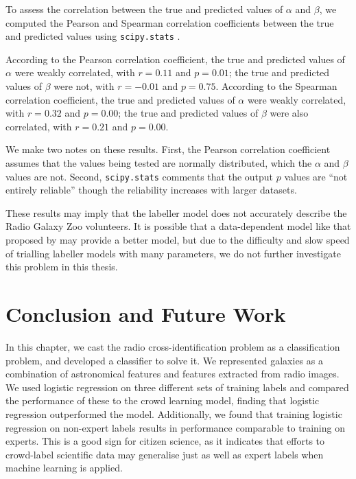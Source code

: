     To assess the correlation between the true and predicted values of $\alpha$
    and $\beta$, we computed the Pearson and Spearman correlation coefficients
    between the true and predicted values using \texttt{scipy.stats}
    \citep{scipy}.

    According to the Pearson correlation coefficient, the true and predicted
    values of $\alpha$ were weakly correlated, with $r = 0.11$ and $p = 0.01$;
    the true and predicted values of $\beta$ were not, with $r = -0.01$ and $p =
    0.75$. According to the Spearman correlation coefficient, the true and
    predicted values of $\alpha$ were weakly correlated, with $r = 0.32$ and $p
    = 0.00$; the true and predicted values of $\beta$ were also correlated, with
    $r = 0.21$ and $p = 0.00$.

    We make two notes on these results. First, the Pearson correlation
    coefficient assumes that the values being tested are normally distributed,
    which the $\alpha$ and $\beta$ values are not. Second, \texttt{scipy.stats}
    comments that the output $p$ values are ``not entirely reliable'' though the
    reliability increases with larger datasets.

    These results may imply that the labeller model does not accurately describe
    the Radio Galaxy Zoo volunteers. It is possible that a data-dependent model
    like that proposed by \citeauthor{yan10} may provide a better model, but due
    to the difficulty and slow speed of trialling labeller models with many
    parameters, we do not further investigate this problem in this thesis.

\section{Conclusion and Future Work}
\label{sec:cross-identification-conclusion-future-work}
  
  In this chapter, we cast the radio cross-identification problem as a
  classification problem, and developed a classifier to solve it. We represented
  galaxies as a combination of astronomical features and features extracted from
  radio images. We used logistic regression on three different sets of training
  labels and compared the performance of these to the \citeauthor{raykar10}
  crowd learning model, finding that logistic regression outperformed the
  \citeauthor{raykar10} model. Additionally, we found that training logistic
  regression on non-expert labels results in performance comparable to training
  on experts. This is a good sign for citizen science, as it indicates that
  efforts to crowd-label scientific data may generalise just as well as expert
  labels when machine learning is applied.

